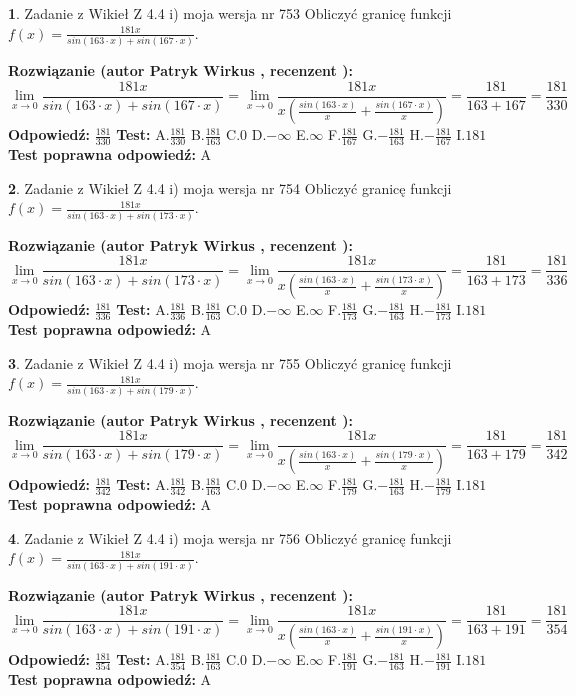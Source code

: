 \documentclass[12pt, a4paper]{article}
\theoremstyle{definition} %
\newtheorem{zad}{}
\newcommand{\zadStart}[1]{\begin{zad}#1\newline}
\newcommand{\zadStop}{\end{zad}}
\newcommand{\rozwStart}[2]{\noindent \textbf{Rozwiązanie (autor #1 , recenzent #2): }\newline}
\newcommand{\rozwStop}{\newline}
\newcommand{\odpStart}{\noindent \textbf{Odpowiedź:}\newline}
\newcommand{\odpStop}{\newline}
\newcommand{\testStart}{\noindent \textbf{Test:}\newline}
\newcommand{\testStop}{\newline}
\newcommand{\kluczStart}{\noindent \textbf{Test poprawna odpowiedź:}\newline}
\newcommand{\kluczStop}{\newline}
\begin{document}
\zadStart{Zadanie z Wikieł Z 4.4 i) moja wersja nr 753}
Obliczyć granicę funkcji $f(x)=\frac{181x}{sin(163\cdot x) +sin(167\cdot x)}$.
\zadStop
\rozwStart{Patryk Wirkus}{}
$$\lim\limits_{x\to 0}\frac{181x}{sin(163\cdot x) +sin(167\cdot x)}=\lim\limits_{x\to 0}\frac{181x}{x(\frac{sin(163\cdot x)}{x}+\frac{sin(167\cdot x)}{x})}=\frac{181}{163+167} = \frac{181}{330}$$
\rozwStop
\odpStart
$\frac{181}{330}$
\odpStop
\testStart
A.$\frac{181}{330}$
B.$\frac{181}{163}$
C.$0$
D.$-\infty$
E.$\infty$
F.$\frac{181}{167}$
G.$-\frac{181}{163}$
H.$-\frac{181}{167}$
I.$181$
\testStop
\kluczStart
A
\kluczStop



\zadStart{Zadanie z Wikieł Z 4.4 i) moja wersja nr 754}
Obliczyć granicę funkcji $f(x)=\frac{181x}{sin(163\cdot x) +sin(173\cdot x)}$.
\zadStop
\rozwStart{Patryk Wirkus}{}
$$\lim\limits_{x\to 0}\frac{181x}{sin(163\cdot x) +sin(173\cdot x)}=\lim\limits_{x\to 0}\frac{181x}{x(\frac{sin(163\cdot x)}{x}+\frac{sin(173\cdot x)}{x})}=\frac{181}{163+173} = \frac{181}{336}$$
\rozwStop
\odpStart
$\frac{181}{336}$
\odpStop
\testStart
A.$\frac{181}{336}$
B.$\frac{181}{163}$
C.$0$
D.$-\infty$
E.$\infty$
F.$\frac{181}{173}$
G.$-\frac{181}{163}$
H.$-\frac{181}{173}$
I.$181$
\testStop
\kluczStart
A
\kluczStop



\zadStart{Zadanie z Wikieł Z 4.4 i) moja wersja nr 755}
Obliczyć granicę funkcji $f(x)=\frac{181x}{sin(163\cdot x) +sin(179\cdot x)}$.
\zadStop
\rozwStart{Patryk Wirkus}{}
$$\lim\limits_{x\to 0}\frac{181x}{sin(163\cdot x) +sin(179\cdot x)}=\lim\limits_{x\to 0}\frac{181x}{x(\frac{sin(163\cdot x)}{x}+\frac{sin(179\cdot x)}{x})}=\frac{181}{163+179} = \frac{181}{342}$$
\rozwStop
\odpStart
$\frac{181}{342}$
\odpStop
\testStart
A.$\frac{181}{342}$
B.$\frac{181}{163}$
C.$0$
D.$-\infty$
E.$\infty$
F.$\frac{181}{179}$
G.$-\frac{181}{163}$
H.$-\frac{181}{179}$
I.$181$
\testStop
\kluczStart
A
\kluczStop



\zadStart{Zadanie z Wikieł Z 4.4 i) moja wersja nr 756}
Obliczyć granicę funkcji $f(x)=\frac{181x}{sin(163\cdot x) +sin(191\cdot x)}$.
\zadStop
\rozwStart{Patryk Wirkus}{}
$$\lim\limits_{x\to 0}\frac{181x}{sin(163\cdot x) +sin(191\cdot x)}=\lim\limits_{x\to 0}\frac{181x}{x(\frac{sin(163\cdot x)}{x}+\frac{sin(191\cdot x)}{x})}=\frac{181}{163+191} = \frac{181}{354}$$
\rozwStop
\odpStart
$\frac{181}{354}$
\odpStop
\testStart
A.$\frac{181}{354}$
B.$\frac{181}{163}$
C.$0$
D.$-\infty$
E.$\infty$
F.$\frac{181}{191}$
G.$-\frac{181}{163}$
H.$-\frac{181}{191}$
I.$181$
\testStop
\kluczStart
A
\kluczStop
\end{document}
